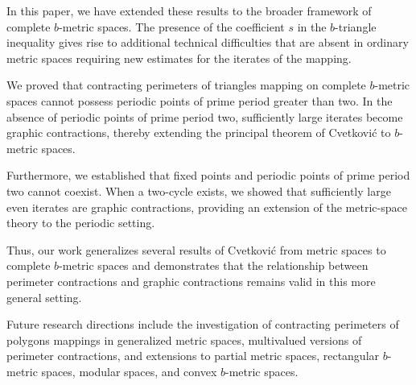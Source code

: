 \documentclass[a4paper,12pt,oneside]{article}
\numberwithin{equation}{section}
\begin{document}
In this paper, we have extended these results to the broader framework of complete $b$-metric spaces. The presence of the coefficient $s$ in the $b$-triangle inequality gives rise to additional technical difficulties that are absent in ordinary metric spaces requiring new estimates for the iterates of the mapping.

We proved that contracting perimeters of triangles mapping on complete $b$-metric spaces cannot possess periodic points of prime period greater than two. In the absence of periodic points of prime period two, sufficiently large iterates become graphic contractions, thereby extending the principal theorem of Cvetković to $b$-metric spaces.

Furthermore, we established that fixed points and periodic points of prime period two cannot coexist. When a two-cycle exists, we showed that sufficiently large even iterates are graphic contractions, providing an extension of the metric-space theory to the periodic setting.

Thus, our work generalizes several results of Cvetković from metric spaces to complete $b$-metric spaces and demonstrates that the relationship between perimeter contractions and graphic contractions remains valid in this more general setting.

Future research directions include the investigation of  contracting perimeters of polygons mappings in generalized metric spaces, multivalued versions of perimeter contractions, and extensions to partial metric spaces, rectangular $b$-metric spaces, modular spaces, and convex $b$-metric spaces.
\end{document}
